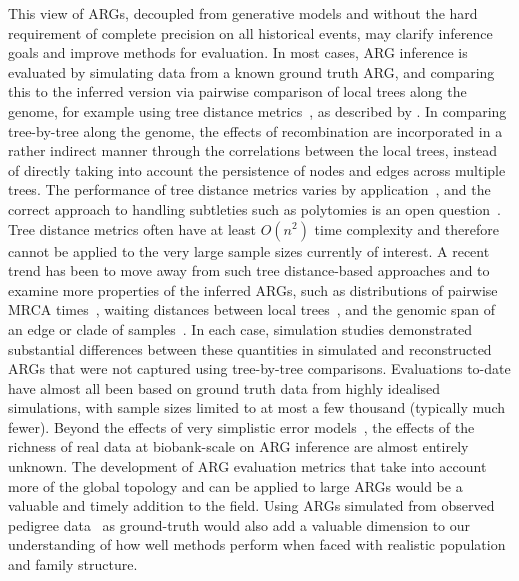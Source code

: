 \documentclass{article}
\begin{document}
This view of ARGs,
decoupled from generative models and
without the hard requirement
of complete precision on all historical events, may clarify inference goals and improve
methods for evaluation.
In most cases,
ARG inference is evaluated by simulating data from a known ground truth ARG,
and comparing this to the inferred version via pairwise comparison of
local trees along the genome, for example
using tree distance
metrics~\citep[e.g.][]{robinson1981comparison,kendall2016mapping},
as described by \citet{kuhner2015assessing}.
In comparing tree-by-tree along the genome, the effects of recombination
are incorporated in a rather indirect manner through the correlations
between the local trees, instead of directly taking into account
the persistence of nodes and edges across multiple trees.
The performance of tree distance metrics varies by
application~\citep{kuhner2015assessing}, and the correct approach
to handling subtleties such as polytomies
is an open question~\citep{kelleher2019inferring,zhang2023biobank}.
Tree distance metrics often have at least $O(n^2)$ time complexity
and therefore cannot be
applied to the very large sample sizes currently of interest.
A recent trend has been to move away from such
tree distance-based approaches and to examine more
properties of the inferred ARGs, such as
distributions of pairwise MRCA times~\citep{brandt2021evaluation},
waiting distances between local trees~\citep{deng2021distribution},
and the genomic span of an edge or clade of
samples~\citep{ignatieva2023distribution}.
In each case, simulation studies demonstrated
substantial differences between these quantities in simulated and
reconstructed ARGs
that were not captured using tree-by-tree comparisons.
Evaluations to-date have almost all been based
on ground truth data from highly idealised simulations,
with sample sizes limited to at most a few thousand (typically much fewer).
Beyond the effects of very simplistic error models~\cite[e.g.][]{kelleher2019inferring},
the effects of the richness of real data
at biobank-scale on ARG inference are almost entirely unknown.
The development of ARG evaluation metrics that take into account more of the
global topology and can be applied to large ARGs would be a
valuable and timely addition to the field.
Using ARGs simulated from observed pedigree data~\citep{anderson2022genes} as
ground-truth would also add a valuable dimension to
our understanding of how well methods perform when faced with
realistic population and family structure.
\end{document}
